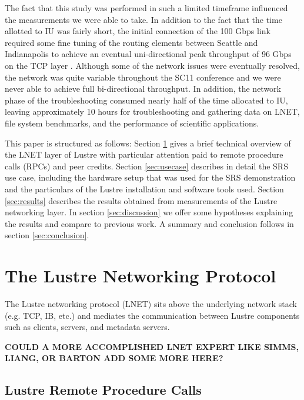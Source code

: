 \documentclass[]{sigplan-proc}
\begin{document}
The fact that this study was performed in such a limited timeframe influenced the measurements we were able to
take. In addition to the fact that the time allotted to IU was fairly short, the initial connection of the 100
Gbps link required some fine tuning of the routing elements between Seattle and Indianapolis to achieve an
eventual uni-directional peak throughput of 96 Gbps on the TCP layer \cite{henschel2012}. Although some of the
network issues were eventually resolved, the network was quite variable throughout the SC11 conference and we
were never able to achieve full bi-directional throughput. In addition, the network phase of the
troubleshooting consumed nearly half of the time allocated to IU, leaving approximately 10 hours for
troubleshooting and gathering data on LNET, file system benchmarks, and the performance of scientific
applications.

This paper is structured as follows: Section \ref{sec:LNET} gives a brief technical overview of the LNET layer
of Lustre with particular attention paid to remote procedure calls (RPCs) and peer credits. Section
\ref{sec:usecase} describes in detail the SRS use case, including the hardware setup that was used for the SRS
demonstration and the particulars of the Lustre installation and software tools used. Section
\ref{sec:results} describes the results obtained from measurements of the Lustre networking layer. In section
\ref{sec:discussion} we offer some hypotheses explaining the results and compare to previous work. A summary and conclusion follows in section \ref{sec:conclusion}.

\section{The Lustre Networking Protocol}\label{sec:LNET}

The Lustre networking protocol (LNET) sits above the underlying network stack (e.g. TCP, IB, etc.) and
mediates the communication between Lustre components such as clients, servers, and metadata servers. 

{\bf COULD A MORE ACCOMPLISHED LNET EXPERT LIKE SIMMS, LIANG, OR BARTON ADD SOME MORE HERE?}

\subsection{Lustre Remote Procedure Calls}
\end{document}
